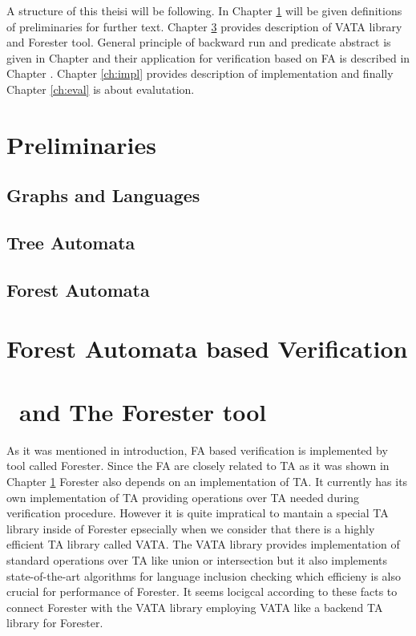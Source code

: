 A structure of this theisi will be following.
In Chapter \ref{ch:prel} will be given definitions of preliminaries for further text.
Chapter \ref{ch:tools} provides description of VATA library and Forester tool.
General principle of backward run and predicate abstract is given in Chapter \label{ch:pred} and their
application for verification based on FA is described in Chapter \label{ch:backwar}.
Chapter \ref{ch:impl} provides description of implementation and finally Chapter \ref{ch:eval} is about evalutation.
\cite{Knuth}

\chapter{Preliminaries}
\label{ch:prel}

\section{Graphs and Languages}
\section{Tree Automata}
\section{Forest Automata}

\chapter{Forest Automata based Verification}

\chapter{\vata\ and The Forester tool}
\label{ch:tools}

As it was mentioned in introduction, FA based verification is implemented by tool
called Forester.
Since the FA are closely related to TA as it was shown in Chapter \ref{ch:prel}
Forester also depends on an implementation of TA.
It currently has its own implementation of TA providing operations over TA needed during verification procedure.
However it is quite impratical to mantain a special TA library inside of Forester
epsecially when we consider that there is a highly efficient TA library called VATA.
The VATA library provides implementation of standard operations over TA like union or intersection
but it also implements state-of-the-art algorithms \cite{tacas11} for language inclusion checking which efficieny
is also crucial for performance of Forester.
It seems locigcal according to these facts to connect Forester with the VATA library employing VATA like a backend TA library for Forester.

